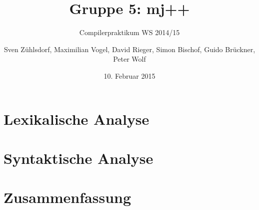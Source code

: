 \documentclass[18pt]{beamer}
\title[]{Gruppe 5: mj++}
\subtitle{Compilerpraktikum WS 2014/15}
\author{Sven Zühlsdorf, Maximilian Vogel, David Rieger, Simon Bischof, Guido Brückner, Peter Wolf}
\date{10. Februar 2015}
\institute{Institut für Programmstrukturen und Datenorganistation}
\newcommand{\code}[1]{\colorbox{lightgray}{\texttt{\upshape #1}}}
\begin{document}

\begin{frame}
\titlepage
\end{frame}


%

\section{Lexikalische Analyse}


\section{Syntaktische Analyse}


\section{Zusammenfassung}

\end{document}
